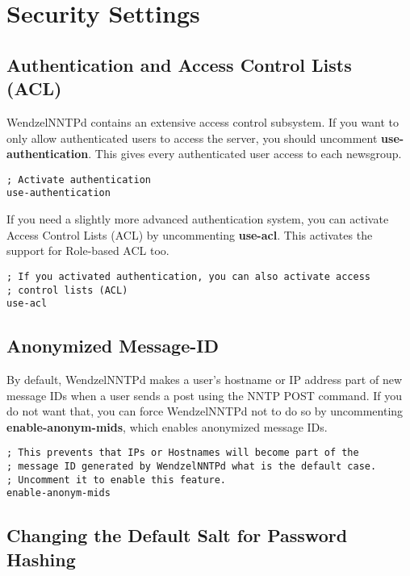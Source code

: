 \section{Security Settings}

\subsection{Authentication and Access Control Lists (ACL)}

WendzelNNTPd contains an extensive access control subsystem. If you want to only allow authenticated users to access the server, you should uncomment \textbf{use-authentication}. This gives every authenticated user access to each newsgroup.

\begin{verbatim}
; Activate authentication
use-authentication
\end{verbatim}

If you need a slightly more advanced authentication system, you can activate Access Control Lists (ACL) by uncommenting \textbf{use-acl}. This activates the support for Role-based ACL too.

\begin{verbatim}
; If you activated authentication, you can also activate access
; control lists (ACL)
use-acl
\end{verbatim}

\subsection{Anonymized Message-ID}

By default, WendzelNNTPd makes a user's hostname or IP address part of new message IDs when a user sends a post using the NNTP POST command. If you do not want that, you can force WendzelNNTPd not to do so by uncommenting \textbf{enable-anonym-mids}, which enables anonymized message IDs.

\begin{verbatim}
; This prevents that IPs or Hostnames will become part of the
; message ID generated by WendzelNNTPd what is the default case.
; Uncomment it to enable this feature.
enable-anonym-mids
\end{verbatim}

\subsection{Changing the Default Salt for Password Hashing}


